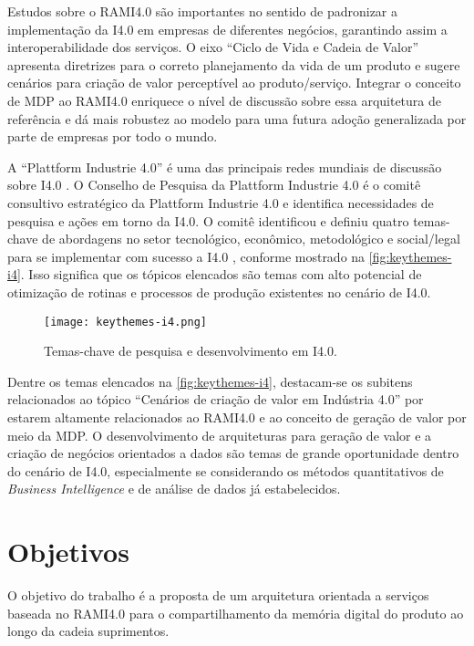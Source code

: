 Estudos sobre o RAMI4.0 são importantes no sentido de padronizar a implementação da I4.0 em empresas de diferentes negócios, garantindo assim a interoperabilidade dos serviços. O eixo ``Ciclo de Vida e Cadeia de Valor'' apresenta diretrizes para o correto planejamento da vida de um produto e sugere cenários para criação de valor perceptível ao produto/serviço. Integrar o conceito de MDP ao RAMI4.0 enriquece o nível de discussão sobre essa arquitetura de referência e dá mais robustez ao modelo para uma futura adoção generalizada por parte de empresas por todo o mundo.

A ``Plattform Industrie 4.0'' é uma das principais redes mundiais de discussão sobre I4.0 \cite{kagermann2013recommendations, acatech2014plattform, germany2019plattform}. O Conselho de Pesquisa da Plattform Industrie 4.0 é o comitê consultivo estratégico da Plattform Industrie 4.0 e identifica necessidades de pesquisa e ações em torno da I4.0. O comitê identificou e definiu quatro temas-chave de abordagens no setor tecnológico, econômico, metodológico e social/legal para se implementar com sucesso a I4.0 \cite{hirsch-kreinsen2019keythemes}, conforme mostrado na \autoref{fig:keythemes-i4}. Isso significa que os tópicos elencados são temas com alto potencial de otimização de rotinas e processos de produção existentes no cenário de I4.0.

\begin{figure}[htb]
	\centering
	\texttt{[image: keythemes-i4.png]}
	\caption{Temas-chave de pesquisa e desenvolvimento em I4.0.}
	\label{fig:keythemes-i4}
\end{figure}

Dentre os temas elencados na \autoref{fig:keythemes-i4}, destacam-se os subitens relacionados ao tópico ``Cenários de criação de valor em Indústria 4.0'' por estarem altamente relacionados ao RAMI4.0 e ao conceito de geração de valor por meio da MDP. O desenvolvimento de arquiteturas para geração de valor e a criação de negócios orientados a dados são temas de grande oportunidade dentro do cenário de I4.0, especialmente se considerando os métodos quantitativos de \textit{Business Intelligence} e de análise de dados já estabelecidos.

\section{Objetivos}

O objetivo do trabalho é a proposta de um arquitetura orientada a serviços baseada no RAMI4.0 para o compartilhamento da memória digital do produto ao longo da cadeia suprimentos.

